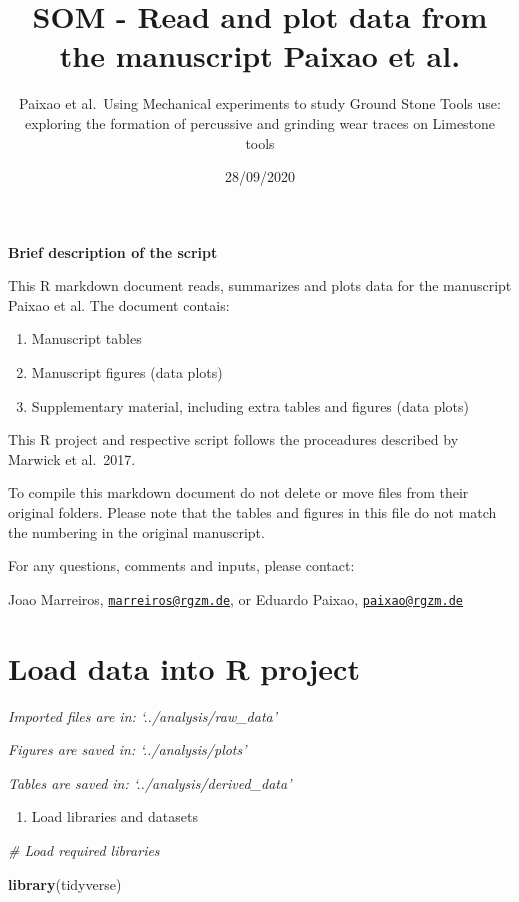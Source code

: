 \documentclass[
]{article}
\title{SOM - Read and plot data from the manuscript Paixao et al.}
\author{Paixao et al.~Using Mechanical experiments to study Ground Stone Tools
use: exploring the formation of percussive and grinding wear traces on
Limestone tools}
\date{28/09/2020}
\newenvironment{Shaded}{\begin{snugshade}}{\end{snugshade}}
\newcommand{\CommentTok}[1]{\textcolor[rgb]{0.56,0.35,0.01}{\textit{#1}}}
\newcommand{\KeywordTok}[1]{\textcolor[rgb]{0.13,0.29,0.53}{\textbf{#1}}}
\newcommand{\NormalTok}[1]{#1}
\providecommand{\tightlist}{%
  \setlength{\itemsep}{0pt}\setlength{\parskip}{0pt}}
\begin{document}
\maketitle

\textbf{Brief description of the script}

This R markdown document reads, summarizes and plots data for the
manuscript Paixao et al. The document contais:

\begin{enumerate}
\def\labelenumi{\arabic{enumi}.}
\tightlist
\item
  Manuscript tables
\item
  Manuscript figures (data plots)
\item
  Supplementary material, including extra tables and figures (data
  plots)
\end{enumerate}

This R project and respective script follows the proceadures described
by Marwick et al.~2017.

To compile this markdown document do not delete or move files from their
original folders. Please note that the tables and figures in this file
do not match the numbering in the original manuscript.

For any questions, comments and inputs, please contact:

Joao Marreiros,
\href{mailto:marreiros@rgzm.de}{\nolinkurl{marreiros@rgzm.de}}, or
Eduardo Paixao, \href{mailto:paixao@rgzm.de}{\nolinkurl{paixao@rgzm.de}}

\hypertarget{load-data-into-r-project}{%
\section{Load data into R project}\label{load-data-into-r-project}}

\emph{Imported files are in: `../analysis/raw\_data'}

\emph{Figures are saved in: `../analysis/plots'}

\emph{Tables are saved in: `../analysis/derived\_data'}

\begin{enumerate}
\def\labelenumi{\arabic{enumi})}
\tightlist
\item
  Load libraries and datasets
\end{enumerate}

\begin{Shaded}
\begin{Highlighting}[]
\CommentTok{# Load required libraries}

\KeywordTok{library}\NormalTok{(tidyverse)}
\end{Highlighting}
\end{Shaded}
\end{document}
